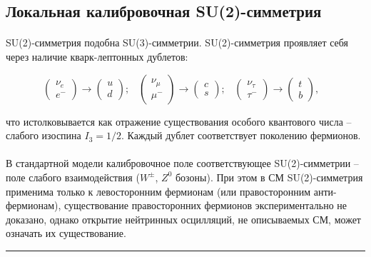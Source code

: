 \documentclass[a4paper,12pt]{article} %
\begin{document}
\subsection{Локальная калибровочная SU(2)-симметрия} \label{ss:su2}

\paragraph{} SU(2)-симметрия подобна SU(3)-симметрии. SU(2)-симметрия проявляет себя через наличие кварк-лептонных дублетов:

\[
\left( \begin{array}{c} \nu_e \\ e^- \end{array} \right) \rightarrow \left( \begin{array}{c} u \\ d \end{array} \right); \;\;\;
\left( \begin{array}{c} \nu_\mu \\ \mu^- \end{array} \right) \rightarrow \left( \begin{array}{c} c \\ s \end{array} \right); \;\;\;
\left( \begin{array}{c} \nu_\tau \\ \tau^- \end{array} \right) \rightarrow \left( \begin{array}{c} t \\ b \end{array} \right), \;\;\;
\]

\noindent что истолковывается как отражение существования особого квантового числа -- слабого изоспина $I_3 = 1/2$. Каждый дублет соответствует поколению фермионов.

\paragraph{} В стандартной модели калибровочное поле соответствующее SU(2)-симметрии -- поле слабого взаимодействия ($W^\pm$, $Z^0$ бозоны). При этом в СМ SU(2)-симметрия применима только к левосторонним фермионам (или правосторонним анти-фермионам), существование правосторонних фермионов экспериментально не доказано, однако открытие нейтринных осцилляций, не описываемых СМ, может означать их существование. 

\medskip\hrule\medskip
\end{document}
